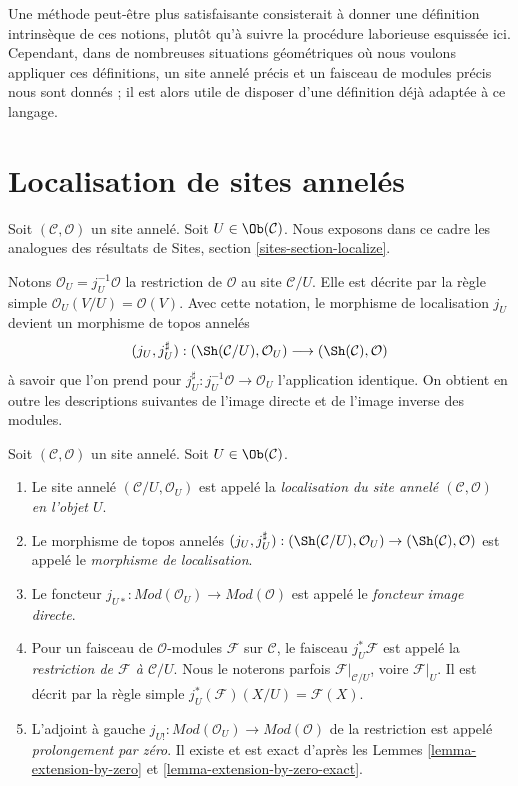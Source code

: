 \medskip\noindent
Une méthode peut-être plus satisfaisante consisterait à donner une définition
intrinsèque de ces notions, plutôt qu'à suivre la procédure laborieuse esquissée
ici. Cependant, dans de nombreuses situations géométriques où nous voulons
appliquer ces définitions, un site annelé précis et un faisceau de modules précis
nous sont donnés ; il est alors utile de disposer d'une définition déjà adaptée
à ce langage.
\section{Localisation de sites annelés}
\label{section-localize}

\noindent
Soit $(\mathcal{C}, \mathcal{O})$ un site annelé.
Soit $U \in \Ob(\mathcal{C})$.
Nous exposons dans ce cadre les analogues des résultats de
Sites, section \ref{sites-section-localize}.

\medskip\noindent
Notons
$\mathcal{O}_U = j_U^{-1}\mathcal{O}$ la restriction de $\mathcal{O}$
au site $\mathcal{C}/U$. Elle est décrite par la règle simple
$\mathcal{O}_U(V/U) = \mathcal{O}(V)$. Avec cette notation,
le morphisme de localisation $j_U$ devient un morphisme de topos annelés
$$
(j_U, j_U^\sharp) :
(\Sh(\mathcal{C}/U), \mathcal{O}_U)
\longrightarrow
(\Sh(\mathcal{C}), \mathcal{O})
$$
à savoir que l'on prend pour
$j_U^\sharp : j_U^{-1}\mathcal{O} \to \mathcal{O}_U$
l'application identique.
On obtient en outre les descriptions suivantes de l'image directe
et de l'image inverse des modules.

\begin{definition}
\label{definition-localize-ringed-site}
Soit $(\mathcal{C}, \mathcal{O})$ un site annelé.
Soit $U \in \Ob(\mathcal{C})$.
\begin{enumerate}
\item Le site annelé $(\mathcal{C}/U, \mathcal{O}_U)$ est appelé la
{\it localisation du site annelé $(\mathcal{C}, \mathcal{O})$
en l'objet $U$}.
\item Le morphisme de topos annelés
$(j_U, j_U^\sharp) :
(\Sh(\mathcal{C}/U), \mathcal{O}_U)
\to
(\Sh(\mathcal{C}), \mathcal{O})$
est appelé le {\it morphisme de localisation}.
\item Le foncteur
$j_{U*} : \textit{Mod}(\mathcal{O}_U) \to \textit{Mod}(\mathcal{O})$
est appelé le {\it foncteur image directe}.
\item Pour un faisceau de $\mathcal{O}$-modules $\mathcal{F}$ sur $\mathcal{C}$,
le faisceau $j_U^*\mathcal{F}$ est appelé la
{\it restriction de $\mathcal{F}$ à $\mathcal{C}/U$}.
Nous le noterons parfois
$\mathcal{F}|_{\mathcal{C}/U}$, voire $\mathcal{F}|_U$.
Il est décrit par la règle simple
$j_U^*(\mathcal{F})(X/U) = \mathcal{F}(X)$.
\item L'adjoint à gauche
$j_{U!} : \textit{Mod}(\mathcal{O}_U) \to \textit{Mod}(\mathcal{O})$
de la restriction est appelé {\it prolongement par zéro}. Il existe et est
exact d'après les
Lemmes \ref{lemma-extension-by-zero} et
\ref{lemma-extension-by-zero-exact}.
\end{enumerate}
\end{definition}


